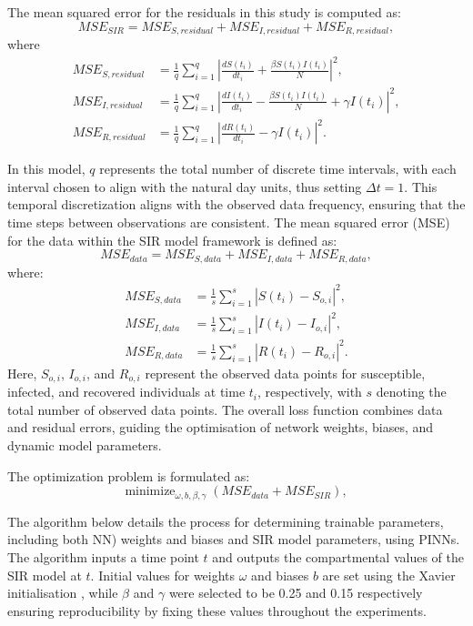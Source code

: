 \documentclass[12pt]{article}
\begin{document}
The mean squared error for the residuals in this study is computed as:
\begin{equation}
    MSE_{SIR} = MSE_{S,residual} + MSE_{I,residual} + MSE_{R,residual},
\end{equation}
where
\begin{align}
    MSE_{S,residual} &= \frac{1}{q} \sum_{i=1}^{q} \left| \frac{dS(t_i)}{dt_i} + \frac{\beta S(t_i)I(t_i)}{N} \right|^2, \\
    MSE_{I,residual} &= \frac{1}{q} \sum_{i=1}^{q} \left| \frac{dI(t_i)}{dt_i} - \frac{\beta S(t_i)I(t_i)}{N} + \gamma I(t_i) \right|^2, \\
    MSE_{R,residual} &= \frac{1}{q} \sum_{i=1}^{q} \left| \frac{dR(t_i)}{dt_i} - \gamma I(t_i) \right|^2.
\end{align}

In this model, \(q\) represents the total number of discrete time intervals, with each interval chosen to align with the natural day units, thus setting \(\Delta t = 1\). This temporal discretization aligns with the observed data frequency, ensuring that the time steps between observations are consistent. The mean squared error (MSE) for the data within the SIR model framework is defined as:
\begin{equation}
    MSE_{data} = MSE_{S,data} + MSE_{I,data} + MSE_{R,data},
\end{equation}
where:
\begin{align}
    MSE_{S,data} &= \frac{1}{s} \sum_{i=1}^{s} \left|S(t_i) - S_{o,i}\right|^2, \\
    MSE_{I,data} &= \frac{1}{s} \sum_{i=1}^{s} \left|I(t_i) - I_{o,i}\right|^2, \\
    MSE_{R,data} &= \frac{1}{s} \sum_{i=1}^{s} \left|R(t_i) - R_{o,i}\right|^2.
\end{align}
Here, \(S_{o,i}\), \(I_{o,i}\), and \(R_{o,i}\) represent the observed data points for susceptible, infected, and recovered individuals at time \(t_i\), respectively, with \(s\) denoting the total number of observed data points. The overall loss function combines data and residual errors, guiding the optimisation of network weights, biases, and dynamic model parameters.

The optimization problem is formulated as:
\begin{equation}
    \text{minimize}_{\omega, b, \beta, \gamma} \; (MSE_{data} + MSE_{SIR}),
\end{equation}

The algorithm below details the process for determining trainable parameters, including both NN) weights and biases and SIR model parameters, using PINNs. The algorithm inputs a time point \(t\) and outputs the compartmental values of the SIR model at \(t\). Initial values for weights \(\omega\) and biases \(b\) are set using the Xavier initialisation \cite{kumar2017weight}, while \(\beta\) and \(\gamma\) were selected to be 0.25 and 0.15 respectively ensuring reproducibility by fixing these values throughout the experiments.
\end{document}
